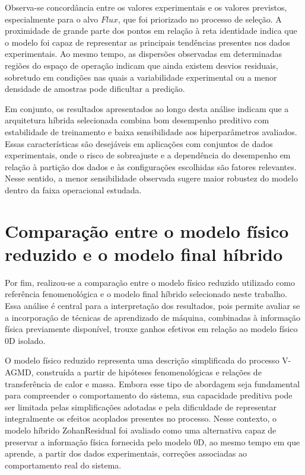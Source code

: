 Observa-se concordância entre os valores experimentais e os valores previstos, especialmente para o alvo $Flux$, que foi priorizado no processo de seleção. A proximidade de grande parte dos pontos em relação à reta identidade indica que o modelo foi capaz de representar as principais tendências presentes nos dados experimentais. Ao mesmo tempo, as dispersões observadas em determinadas regiões do espaço de operação indicam que ainda existem desvios residuais, sobretudo em condições nas quais a variabilidade experimental ou a menor densidade de amostras pode dificultar a predição.

Em conjunto, os resultados apresentados ao longo desta análise indicam que a arquitetura híbrida selecionada combina bom desempenho preditivo com estabilidade de treinamento e baixa sensibilidade aos hiperparâmetros avaliados. Essas características são desejáveis em aplicações com conjuntos de dados experimentais, onde o risco de sobreajuste e a dependência do desempenho em relação à partição dos dados e às configurações escolhidas são fatores relevantes. Nesse sentido, a menor sensibilidade observada sugere maior robustez do modelo dentro da faixa operacional estudada.
\section{Comparação entre o modelo físico reduzido e o modelo final híbrido}
\label{subsec:comparacao_modelo_fisico_modelo_final}

Por fim, realizou-se a comparação entre o modelo físico reduzido utilizado como referência fenomenológica e o modelo final híbrido selecionado neste trabalho. Essa análise é central para a interpretação dos resultados, pois permite avaliar se a incorporação de técnicas de aprendizado de máquina, combinadas à informação física previamente disponível, trouxe ganhos efetivos em relação ao modelo físico 0D isolado.

O modelo físico reduzido representa uma descrição simplificada do processo V-AGMD, construída a partir de hipóteses fenomenológicas e relações de transferência de calor e massa. Embora esse tipo de abordagem seja fundamental para compreender o comportamento do sistema, sua capacidade preditiva pode ser limitada pelas simplificações adotadas e pela dificuldade de representar integralmente os efeitos acoplados presentes no processo. Nesse contexto, o modelo híbrido ZohanResidual foi avaliado como uma alternativa capaz de preservar a informação física fornecida pelo modelo 0D, ao mesmo tempo em que aprende, a partir dos dados experimentais, correções associadas ao comportamento real do sistema.

